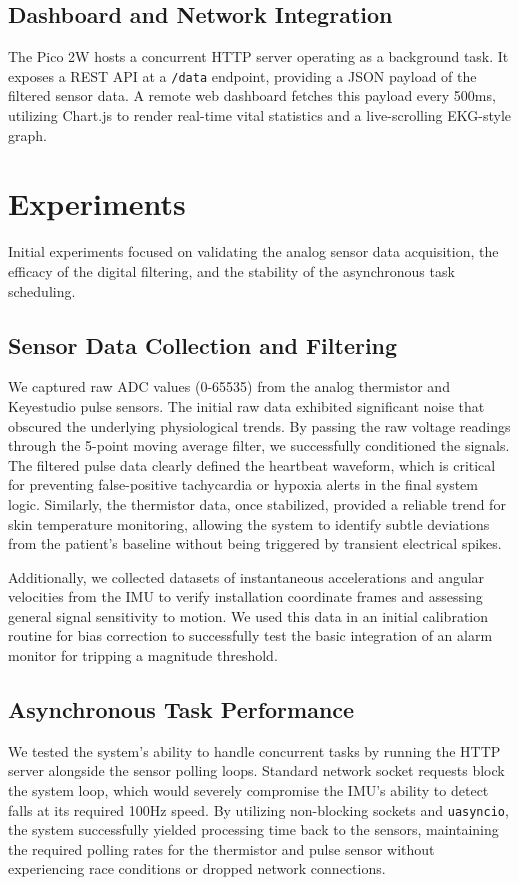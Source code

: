 \documentclass[conference]{IEEEtran}
\begin{document}
\subsection{Dashboard and Network Integration}
The Pico 2W hosts a concurrent HTTP server operating as a background task. It exposes a REST API at a \texttt{/data} endpoint, providing a JSON payload of the filtered sensor data. A remote web dashboard fetches this payload every 500ms, utilizing Chart.js to render real-time vital statistics and a live-scrolling EKG-style graph.

\section{Experiments}\label{experiments}
Initial experiments focused on validating the analog sensor data acquisition, the efficacy of the digital filtering, and the stability of the asynchronous task scheduling.

\subsection{Sensor Data Collection and Filtering}
We captured raw ADC values (0-65535) from the analog thermistor and Keyestudio pulse sensors. The initial raw data exhibited significant noise that obscured the underlying physiological trends. By passing the raw voltage readings through the 5-point moving average filter, we successfully conditioned the signals. The filtered pulse data clearly defined the heartbeat waveform, which is critical for preventing false-positive tachycardia or hypoxia alerts in the final system logic. Similarly, the thermistor data, once stabilized, provided a reliable trend for skin temperature monitoring, allowing the system to identify subtle deviations from the patient's baseline without being triggered by transient electrical spikes. 

Additionally, we collected datasets of instantaneous accelerations and angular velocities from the IMU to verify installation coordinate frames and assessing general signal sensitivity to motion. We used this data in an initial calibration routine for bias correction to successfully test the basic integration of an alarm monitor for tripping a magnitude threshold.

\subsection{Asynchronous Task Performance}
We tested the system's ability to handle concurrent tasks by running the HTTP server alongside the sensor polling loops. Standard network socket requests block the system loop, which would severely compromise the IMU's ability to detect falls at its required 100Hz speed. By utilizing non-blocking sockets and \texttt{uasyncio}, the system successfully yielded processing time back to the sensors, maintaining the required polling rates for the thermistor and pulse sensor without experiencing race conditions or dropped network connections.
\end{document}
